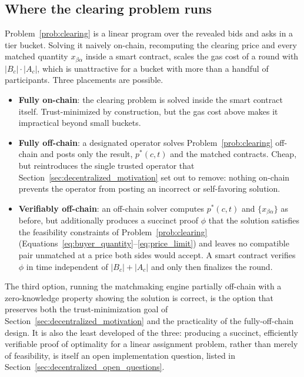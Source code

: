 \subsection{Where the clearing problem runs}
\label{sec:decentralized_matching_engine}

Problem~\ref{prob:clearing} is a linear program over the revealed bids and
asks in a tier bucket. Solving it naively on-chain, recomputing the
clearing price and every matched quantity $x_{\beta\alpha}$ inside a smart
contract, scales the gas cost of a round with $|B_c| \cdot |A_c|$, which
is unattractive for a bucket with more than a handful of participants.
Three placements are possible.

\begin{itemize}
  \item \textbf{Fully on-chain}: the clearing problem is solved inside the
    smart contract itself. Trust-minimized by construction, but the gas
    cost above makes it impractical beyond small buckets.

  \item \textbf{Fully off-chain}: a designated operator solves
    Problem~\ref{prob:clearing} off-chain and posts only the result,
    $p^*(c, t)$ and the matched contracts. Cheap, but reintroduces the
    single trusted operator that Section~\ref{sec:decentralized_motivation}
    set out to remove: nothing on-chain prevents the operator from posting
    an incorrect or self-favoring solution.

  \item \textbf{Verifiably off-chain}: an off-chain solver computes
    $p^*(c, t)$ and $\{x_{\beta\alpha}\}$ as before, but additionally
    produces a succinct proof $\phi$ that the solution satisfies the
    feasibility constraints of Problem~\ref{prob:clearing}
    (Equations~\eqref{eq:buyer_quantity}--\eqref{eq:price_limit}) and
    leaves no compatible pair unmatched at a price both sides would
    accept. A smart contract verifies $\phi$ in time independent of
    $|B_c| + |A_c|$ and only then finalizes the round.
\end{itemize}

The third option, running the matchmaking engine partially off-chain with
a zero-knowledge property showing the solution is correct, is the option
that preserves both the trust-minimization goal of
Section~\ref{sec:decentralized_motivation} and the practicality of the
fully-off-chain design. It is also the least developed of the three:
producing a succinct, efficiently verifiable proof of optimality for a
linear assignment problem, rather than merely of feasibility, is itself an
open implementation question, listed in
Section~\ref{sec:decentralized_open_questions}.

